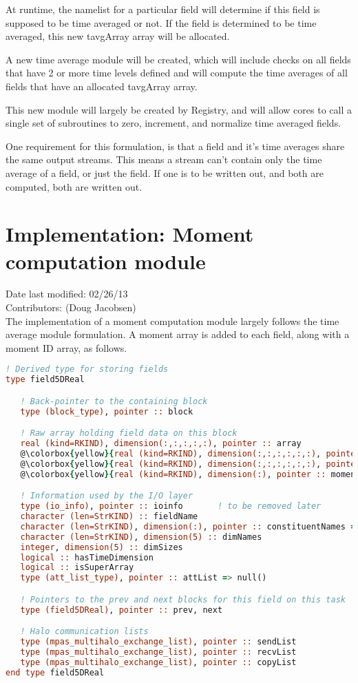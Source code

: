 \documentclass[11pt]{report}
\begin{document}
At runtime, the namelist for a particular field will determine if this field is
supposed to be time averaged or not. If the field is determined to be time
averaged, this new tavgArray array will be allocated.

A new time average module will be created, which will include checks on all
fields that have 2 or more time levels defined and will compute the time averages
of all fields that have an allocated tavgArray array.

This new module will largely be created by Registry, and will allow cores to
call a single set of subroutines to zero, increment, and normalize time
averaged fields. 

One requirement for this formulation, is that a field and it's time averages
share the same output streams. This means a stream can't contain only the time
average of a field, or just the field. If one is to be written out, and both
are computed, both are written out.

\section{Implementation: Moment computation module}
Date last modified: 02/26/13 \\
Contributors: (Doug Jacobsen) \\

The implementation of a moment computation module largely follows the time
average module formulation. A moment array is added to each field, along with a
moment ID array, as follows.

{\tiny
\begin{lstlisting}[language=fortran,escapechar=@,frame=single]
! Derived type for storing fields
type field5DReal

   ! Back-pointer to the containing block
   type (block_type), pointer :: block

   ! Raw array holding field data on this block
   real (kind=RKIND), dimension(:,:,:,:,:), pointer :: array
   @\colorbox{yellow}{real (kind=RKIND), dimension(:,:,:,:,:,:), pointer :: tavgMoments}@
   @\colorbox{yellow}{real (kind=RKIND), dimension(:,:,:,:,:,:), pointer :: momentsArray}@
   @\colorbox{yellow}{real (kind=RKIND), dimension(:), pointer :: momentIDs}@

   ! Information used by the I/O layer
   type (io_info), pointer :: ioinfo       ! to be removed later
   character (len=StrKIND) :: fieldName
   character (len=StrKIND), dimension(:), pointer :: constituentNames => null()
   character (len=StrKIND), dimension(5) :: dimNames
   integer, dimension(5) :: dimSizes
   logical :: hasTimeDimension
   logical :: isSuperArray
   type (att_list_type), pointer :: attList => null()     

   ! Pointers to the prev and next blocks for this field on this task
   type (field5DReal), pointer :: prev, next

   ! Halo communication lists
   type (mpas_multihalo_exchange_list), pointer :: sendList
   type (mpas_multihalo_exchange_list), pointer :: recvList
   type (mpas_multihalo_exchange_list), pointer :: copyList
end type field5DReal
\end{lstlisting}
}
\end{document}
